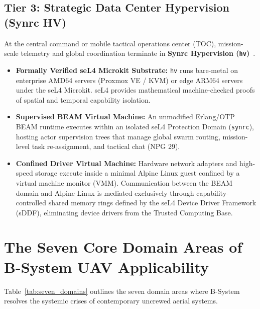 \documentclass[10pt,journal,compsoc,twocolumn]{article}
\begin{document}
\subsection{Tier 3: Strategic Data Center Hypervision (Synrc HV)}
At the central command or mobile tactical operations center (TOC), mission-scale telemetry and global coordination terminate in \textbf{Synrc Hypervision (\texttt{hv})}~\cite{synrc_hv_spec}.
\begin{itemize}[leftmargin=*]
    \item \textbf{Formally Verified seL4 Microkit Substrate:} \texttt{hv} runs bare-metal on enterprise AMD64 servers (Proxmox VE / KVM) or edge ARM64 servers under the seL4 Microkit. seL4 provides mathematical machine-checked proofs of spatial and temporal capability isolation.
    \item \textbf{Supervised BEAM Virtual Machine:} An unmodified Erlang/OTP BEAM runtime executes within an isolated seL4 Protection Domain (\texttt{synrc}), hosting actor supervision trees that manage global swarm routing, mission-level task re-assignment, and tactical chat (NPG 29).
    \item \textbf{Confined Driver Virtual Machine:} Hardware network adapters and high-speed storage execute inside a minimal Alpine Linux guest confined by a virtual machine monitor (VMM). Communication between the BEAM domain and Alpine Linux is mediated exclusively through capability-controlled shared memory rings defined by the seL4 Device Driver Framework (sDDF), eliminating device drivers from the Trusted Computing Base.
\end{itemize}

\section{The Seven Core Domain Areas of B-System UAV Applicability}
\label{sec:domains}

Table~\ref{tab:seven_domains} outlines the seven domain areas where B-System resolves the systemic crises of contemporary uncrewed aerial systems.
\end{document}
